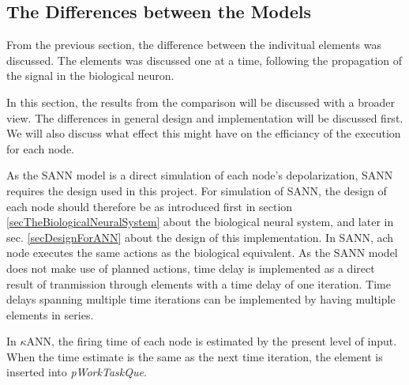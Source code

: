 		\subsection{The Differences between the Models} %
		From the previous section, the difference between the indivitual elements was discussed. 
		The elements was discussed one at a time, following the propagation of the signal in the biological neuron.

		In this section, the results from the comparison will be discussed with a broader view.
		The differences in general design and implementation will be discussed first.
		We will also discuss what effect this might have on the efficiancy of the execution for each node.


		As the SANN model is a direct simulation of each node's depolarization, SANN requires the design used in this project.
		For simulation of SANN, the design of each node should therefore be as introduced first in section \ref{secTheBiologicalNeuralSystem} about the biological neural system, 
			and later in sec. \ref{secDesignForANN} about the design of this implementation.
		In SANN, ach node executes the same actions as the biological equivalent.
		As the SANN model does not make use of planned actions, time delay is implemented as a direct result of tranmission through elements with a time delay of one iteration.
		Time delays spanning multiple time iterations can be implemented by having multiple elements in series.


		In $\kappa$ANN, the firing time of each node is estimated by the present level of input. 
		When the time estimate is the same as the next time iteration, the element is inserted into \emph{pWorkTaskQue}.
		
